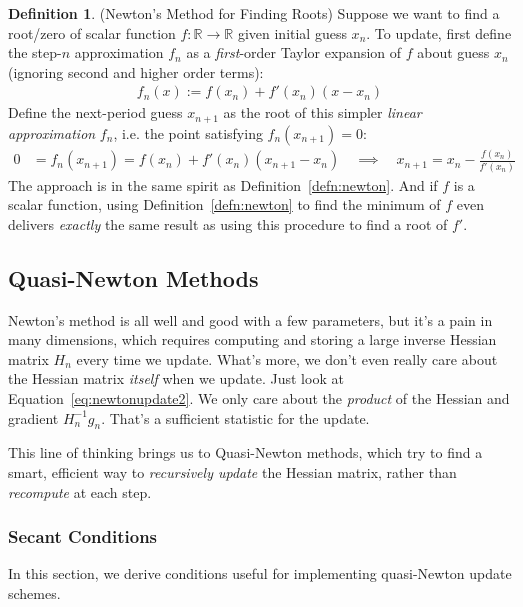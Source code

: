 \documentclass[12pt]{article}
\numberwithin{equation}{section} %
\theoremstyle{plain}
\theoremstyle{definition}
\newtheorem{defn}[thm]{Definition}
\theoremstyle{remark}
\newcommand{\ra}{\rightarrow}
\newcommand{\R}{\mathbb{R}}
\begin{document}
\begin{defn}(Newton's Method for Finding Roots)
Suppose we want to find a root/zero of scalar function $f:\R\ra\R$ given
initial guess $x_n$.
To update, first define the step-$n$ approximation $f_n$ as a
\emph{first}-order Taylor expansion of $f$ about guess $x_n$ (ignoring
second and higher order terms):
\begin{align*}
  f_n(x) := f(x_n) + f'(x_n)(x-x_n)
\end{align*}
Define the next-period guess $x_{n+1}$ as the root of this simpler
\emph{linear approximation} $f_n$, i.e. the point satisfying
$f_n(x_{n+1})=0$:
\begin{align}
  0 &= f_n(x_{n+1})
  = f(x_n) + f'(x_n)(x_{n+1}-x_n)
  \quad\implies\quad
  x_{n+1} = x_n - \frac{f(x_n)}{f'(x_n)}
\end{align}
The approach is in the same spirit as Definition~\ref{defn:newton}.
And if $f$ is a scalar function, using Definition~\ref{defn:newton} to
find the minimum of $f$ even delivers \emph{exactly} the same result as
using this procedure to find a root of $f'$.
\end{defn}


\clearpage
\subsection{Quasi-Newton Methods}

Newton's method is all well and good with a few parameters, but it's a
pain in many dimensions, which requires computing and storing a large
inverse Hessian matrix $H_n$ every time we update. What's more, we don't
even really care about the Hessian matrix \emph{itself} when we update.
Just look at Equation~\ref{eq:newtonupdate2}. We only care about the
\emph{product} of the Hessian and gradient $H_n^{-1} g_n$. That's a
sufficient statistic for the update.

This line of thinking brings us to Quasi-Newton methods, which try to
find a smart, efficient way to \emph{recursively update} the Hessian
matrix, rather than \emph{recompute} at each step.

\subsubsection{Secant Conditions}

In this section, we derive conditions useful for implementing
quasi-Newton update schemes.
\end{document}
